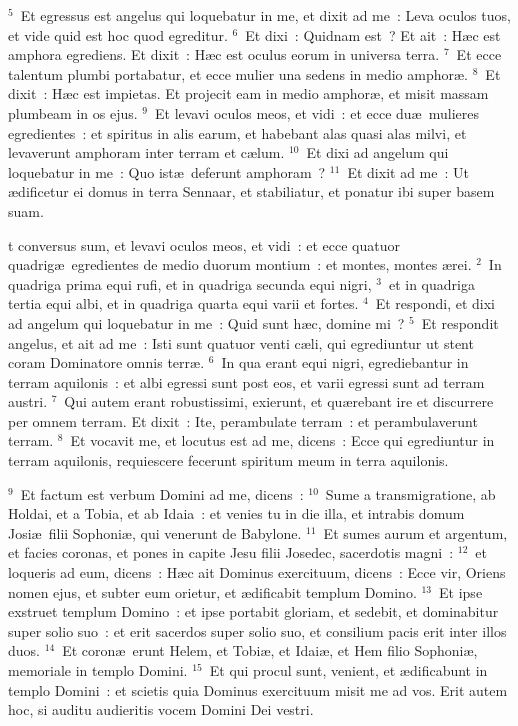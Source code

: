 ${}^{5}$~Et egressus est angelus qui loquebatur in me, et dixit ad me~: Leva oculos tuos, et vide quid est hoc quod egreditur.
${}^{6}$~Et dixi~: Quidnam est~? Et ait~: H\ae c est amphora egrediens. Et dixit~: H\ae c est oculus eorum in universa terra.
${}^{7}$~Et ecce talentum plumbi portabatur, et ecce mulier una sedens in medio amphor\ae .
${}^{8}$~Et dixit~: H\ae c est impietas. Et projecit eam in medio amphor\ae , et misit massam plumbeam in os ejus.
${}^{9}$~Et levavi oculos meos, et vidi~: et ecce du\ae\ mulieres egredientes~: et spiritus in alis earum, et habebant alas quasi alas milvi, et levaverunt amphoram inter terram et c\ae lum.
${}^{10}$~Et dixi ad angelum qui loquebatur in me~: Quo ist\ae\ deferunt amphoram~?
${}^{11}$~Et dixit ad me~: Ut \ae dificetur ei domus in terra Sennaar, et stabiliatur, et ponatur ibi super basem suam.

\bchapter
{}t conversus sum, et levavi oculos meos, et vidi~: et ecce quatuor quadrig\ae\ egredientes de medio duorum montium~: et montes, montes \ae rei.
${}^{2}$~In quadriga prima equi rufi, et in quadriga secunda equi nigri,
${}^{3}$~et in quadriga tertia equi albi, et in quadriga quarta equi varii et fortes.
${}^{4}$~Et respondi, et dixi ad angelum qui loquebatur in me~: Quid sunt h\ae c, domine mi~?
${}^{5}$~Et respondit angelus, et ait ad me~: Isti sunt quatuor venti c\ae li, qui egrediuntur ut stent coram Dominatore omnis terr\ae .
${}^{6}$~In qua erant equi nigri, egrediebantur in terram aquilonis~: et albi egressi sunt post eos, et varii egressi sunt ad terram austri.
${}^{7}$~Qui autem erant robustissimi, exierunt, et qu\ae rebant ire et discurrere per omnem terram. Et dixit~: Ite, perambulate terram~: et perambulaverunt terram.
${}^{8}$~Et vocavit me, et locutus est ad me, dicens~: Ecce qui egrediuntur in terram aquilonis, requiescere fecerunt spiritum meum in terra aquilonis.


${}^{9}$~Et factum est verbum Domini ad me, dicens~:
${}^{10}$~Sume a transmigratione, ab Holdai, et a Tobia, et ab Idaia~: et venies tu in die illa, et intrabis domum Josi\ae\ filii Sophoni\ae , qui venerunt de Babylone.
${}^{11}$~Et sumes aurum et argentum, et facies coronas, et pones in capite Jesu filii Josedec, sacerdotis magni~:
${}^{12}$~et loqueris ad eum, dicens~: H\ae c ait Dominus exercituum, dicens~: Ecce vir, Oriens nomen ejus, et subter eum orietur, et \ae dificabit templum Domino.
${}^{13}$~Et ipse exstruet templum Domino~: et ipse portabit gloriam, et sedebit, et dominabitur super solio suo~: et erit sacerdos super solio suo, et consilium pacis erit inter illos duos.
${}^{14}$~Et coron\ae\ erunt Helem, et Tobi\ae , et Idai\ae , et Hem filio Sophoni\ae , memoriale in templo Domini.
${}^{15}$~Et qui procul sunt, venient, et \ae dificabunt in templo Domini~: et scietis quia Dominus exercituum misit me ad vos. Erit autem hoc, si auditu audieritis vocem Domini Dei vestri.

